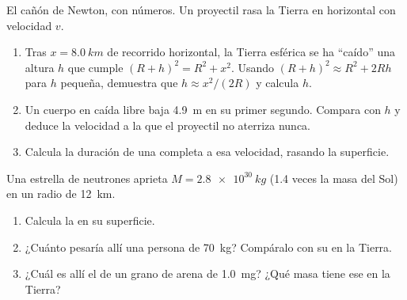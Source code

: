 \begin{exercise}[$\star\star\star$]\label{exo:g10:universal-gravitation:13}
El cañón de Newton, con números. Un proyectil rasa la Tierra en
horizontal con velocidad $v$.
\begin{enumerate}
  \item Tras $x = \qty{8.0}{km}$ de recorrido horizontal, la Tierra
        esférica se ha ``caído'' una altura $h$ que cumple
        $(R + h)^2 = R^2 + x^2$. Usando
        $(R + h)^2 \approx R^2 + 2Rh$ para $h$ pequeña, demuestra que
        $h \approx x^2 / (2R)$ y calcula $h$.
  \item Un cuerpo en caída libre baja \qty{4.9}{m} en su primer segundo.
        Compara con $h$ y deduce la velocidad a la que el proyectil no
        aterriza nunca.
  \item Calcula la duración de una  completa a esa velocidad,
        rasando la superficie.
\end{enumerate}
\end{exercise}

\begin{exercise}[$\star\star\star$]\label{exo:g10:universal-gravitation:14}
Una estrella de neutrones aprieta $M = \qty{2.8e30}{kg}$ (1.4 veces la
masa del Sol) en un radio de \qty{12}{km}.
\begin{enumerate}
  \item Calcula la  en su superficie.
  \item ¿Cuánto pesaría allí una persona de \qty{70}{kg}? Compáralo con
        su  en la Tierra.
  \item ¿Cuál es allí el  de un grano de arena de \qty{1.0}{mg}?
        ¿Qué masa tiene ese  en la Tierra?
\end{enumerate}
\end{exercise}

